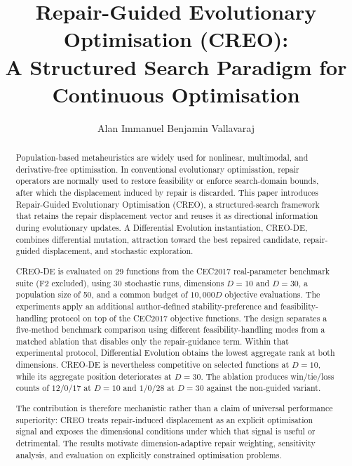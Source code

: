 \documentclass[a4paper,fleqn]{cas-sc}
\begin{document}
\let\WriteBookmarks\relax
\def\floatpagepagefraction{1}
\def\textpagefraction{.001}


\title[mode=title]{Repair-Guided Evolutionary Optimisation (CREO):\\
A Structured Search Paradigm for Continuous Optimisation}

\author[1]{Alan Immanuel Benjamin Vallavaraj}
\cormark[1]



\begin{abstract}
Population-based metaheuristics are widely used for nonlinear, multimodal, and derivative-free optimisation. In conventional evolutionary optimisation, repair operators are normally used to restore feasibility or enforce search-domain bounds, after which the displacement induced by repair is discarded. This paper introduces Repair-Guided Evolutionary Optimisation (CREO), a structured-search framework that retains the repair displacement vector and reuses it as directional information during evolutionary updates. A Differential Evolution instantiation, CREO-DE, combines differential mutation, attraction toward the best repaired candidate, repair-guided displacement, and stochastic exploration.

CREO-DE is evaluated on 29 functions from the CEC2017 real-parameter benchmark suite (F2 excluded), using 30 stochastic runs, dimensions $D=10$ and $D=30$, a population size of 50, and a common budget of $10{,}000D$ objective evaluations. The experiments apply an additional author-defined stability-preference and feasibility-handling protocol on top of the CEC2017 objective functions. The design separates a five-method benchmark comparison using different feasibility-handling modes from a matched ablation that disables only the repair-guidance term. Within that experimental protocol, Differential Evolution obtains the lowest aggregate rank at both dimensions. CREO-DE is nevertheless competitive on selected functions at $D=10$, while its aggregate position deteriorates at $D=30$. The ablation produces win/tie/loss counts of $12/0/17$ at $D=10$ and $1/0/28$ at $D=30$ against the non-guided variant.

The contribution is therefore mechanistic rather than a claim of universal performance superiority: CREO treats repair-induced displacement as an explicit optimisation signal and exposes the dimensional conditions under which that signal is useful or detrimental. The results motivate dimension-adaptive repair weighting, sensitivity analysis, and evaluation on explicitly constrained optimisation problems.
\end{abstract}
\end{document}
